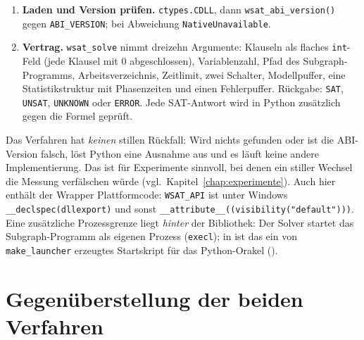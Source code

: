 \begin{enumerate}
	\item \textbf{Laden und Version prüfen.} \texttt{ctypes.CDLL}, dann \texttt{wsat\_abi\_version()} gegen \texttt{ABI\_VERSION}; bei Abweichung \texttt{NativeUnavailable}.
	\item \textbf{Vertrag.} \texttt{wsat\_solve} nimmt dreizehn Argumente: Klauseln als flaches \texttt{int}-Feld (jede Klausel mit $0$ abgeschlossen), Variablenzahl, Pfad des Subgraph-Programms, Arbeitsverzeichnis, Zeitlimit, zwei Schalter, Modellpuffer, eine Statistikstruktur mit Phasenzeiten und einen Fehlerpuffer. Rückgabe: \texttt{SAT}, \texttt{UNSAT}, \texttt{UNKNOWN} oder \texttt{ERROR}. Jede SAT-Antwort wird in Python zusätzlich gegen die Formel geprüft.
\end{enumerate}

Das Verfahren hat \emph{keinen} stillen Rückfall: Wird nichts gefunden oder ist die ABI-Version falsch, löst Python eine Ausnahme aus und es läuft keine andere Implementierung. Das ist für Experimente sinnvoll, bei denen ein stiller Wechsel die Messung verfälschen würde (vgl.\ Kapitel~\ref{chap:experimente}). Auch hier enthält der Wrapper Plattformcode: \texttt{WSAT\_API} ist unter Windows \texttt{\_\_declspec(dllexport)} und sonst \texttt{\_\_attribute\_\_((visibility("default")))}. Eine zusätzliche Prozessgrenze liegt \emph{hinter} der Bibliothek: Der Solver startet das Subgraph-Programm als eigenen Prozess (\texttt{execl}); in  ist das ein von \texttt{make\_launcher} erzeugtes Startskript für das Python-Orakel ().

\section{Gegenüberstellung der beiden Verfahren}
\label{sec:laden_vergleich}

